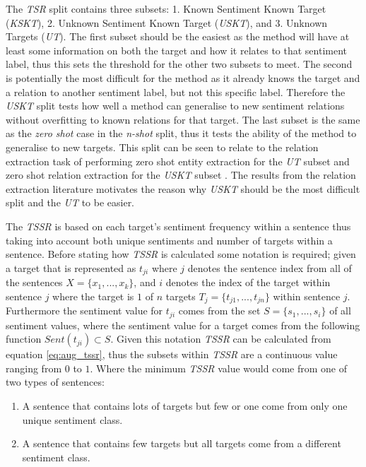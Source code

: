 The \textit{TSR} split contains three subsets: 1. Known Sentiment Known Target (\textit{KSKT}), 2. Unknown Sentiment Known Target (\textit{USKT}), and 3. Unknown Targets (\textit{UT}). The first subset should be the easiest as the method will have at least some information on both the target and how it relates to that sentiment label, thus this sets the threshold for the other two subsets to meet. The second is potentially the most difficult for the method as it already knows the target and a relation to another sentiment label, but not this specific label. Therefore the \textit{USKT} split tests how well a method can generalise to new sentiment relations without overfitting to known relations for that target. The last subset is the same as the \textit{zero shot} case in the \textit{n-shot} split, thus it tests the ability of the method to generalise to new targets. This split can be seen to relate to the relation extraction task of performing zero shot entity extraction for the \textit{UT} subset and zero shot relation extraction for the \textit{USKT} subset \citet{aug_levy-etal-2017-zero}. The results from the relation extraction literature \citep{aug_levy-etal-2017-zero,aug_abdou2019x} motivates the reason why \textit{USKT} should be the most difficult split and the \textit{UT} to be easier.

The \textit{TSSR} is based on each target's sentiment frequency within a sentence thus taking into account both unique sentiments and number of targets within a sentence. Before stating how \textit{TSSR} is calculated some notation is required; given a target that is represented as $t_{ji}$ where $j$ denotes the sentence index from all of the sentences $X=\{x_1,...,x_k\}$, and $i$ denotes the index of the target within sentence $j$ where the target is $1$ of $n$ targets $T_j=\{t_{j1},...,t_{jn}\}$ within sentence $j$. Furthermore the sentiment value for $t_{ji}$ comes from the set $S=\{s_1,...,s_i\}$ of all sentiment values, where the sentiment value for a target comes from the following function $Sent(t_{ji})\subset S$. Given this notation \textit{TSSR} can be calculated from equation \ref{eq:aug_tssr}, thus the subsets within \textit{TSSR} are a continuous value ranging from $0$ to $1$. Where the minimum \textit{TSSR} value would come from one of two types of sentences:
\begin{enumerate}
    \item A sentence that contains lots of targets but few or one come from only one unique sentiment class.
    \item A sentence that contains few targets but all targets come from a different sentiment class.
\end{enumerate}

